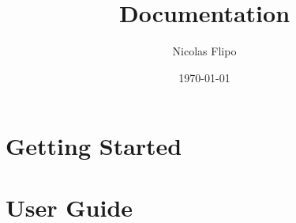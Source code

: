 \documentclass[11pt,a4paper]{book}
\title{%
  \cgspkg{} \cgsversion \\[0.5em]
  \large Documentation
}
\author{Nicolas Flipo}
\date{\today}
\begin{document}
\maketitle
\tableofcontents

\chapter{Getting Started}


\chapter{User Guide}
\label{chap:user-guide}

\end{document}
